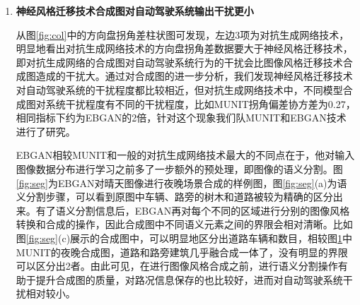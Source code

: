 \begin{enumerate}[itemindent=20pt, listparindent = 0.7cm]
    \begin{figure}[h]
        \centering
        \texttt{[image: gan\_bad]}
        \texttt{[image: models/EBGAN/8]}
        \texttt{[image: models/GAN/1]}
        \caption{MUNIT合成图像样本}
        \label{fig:gan}
    \end{figure}
    
    大部分的对抗生成网络技术中，合成数据的质量主要依赖于系统中的生成器对于原始数据分布的学习能力，以图像数据的生成为例，生成器在学习原图像数据分布时并没有对远图像的语义和风格信息作特殊处理，对图像内容的语义信息也没有类似于语义分割的处理，它是将原图像数据当做一个整体进行数据分布的学习，因此往往会导致最后判别器产生的合成图是对原始图的全盘模拟，特别的当输入数据由风格图和内容图两张图组成时，合成图会展现出两者的综合效果，例如图\ref{fig:gan}展示的,可以发现合成图不仅有白天的道路信息，风格图存在而原图中不存在的建筑、路灯信息却大量地出现在了合成图中。
    
    虽然从合成图与原图相似度上看，对抗生成网络技术的性能不如神经风格迁移技术，但任何事物都有两面性，因为对抗生成网络合成图与原图的差异性是最大的，因此如果想提高自动驾驶系统测试框架中测试用例的覆盖率，即增加路况图像集的多样性，显然使用对抗生成网络相关技术较神经风格迁移技术而言更加合适。

    \item \textbf{神经风格迁移技术合成图对自动驾驶系统输出干扰更小}
    
    从图\ref{fig:col}中的方向盘拐角差柱状图可发现，左边3项为对抗生成网络技术，明显地看出对抗生成网络技术的方向盘拐角差数据要大于神经风格迁移技术，即对抗生成网络的合成图对自动驾驶系统行为的干扰会比图像风格迁移技术合成图造成的干扰大。通过对合成图的进一步分析，我们发现神经风格迁移技术对自动驾驶系统的干扰程度都比较相近，但对抗生成网络技术中，不同模型合成图对系统干扰程度有不同的干扰程度，比如MUNIT拐角偏差协方差为0.27，相同指标下约为EBGAN的2倍，针对这个现象我们队MUNIT和EBGAN技术进行了研究。

    EBGAN相较MUNIT和一般的对抗生成网络技术最大的不同点在于，他对输入图像数据分布进行学习之前多了一步额外的预处理，即图像的语义分割。图\ref{fig:seg}为EBGAN对晴天图像进行夜晚场景合成的样例图，图\ref{fig:seg}(a)为语义分割步骤，可以看到原图中车辆、路旁的树木和道路被较为精确的区分出来。有了语义分割信息后，EBGAN再对每个不同的区域进行分别的图像风格转换和合成的操作，因此合成图中不同语义元素之间的界限会相对清晰。比如图\ref{fig:seg}(c)展示的合成图中，可以明显地区分出道路车辆和数目，相较图\ref{fig:gan}中MUNIT的夜晚合成图，道路和路旁建筑几乎融合成一体了，没有明显的界限可以区分出2者。由此可见，在进行图像风格合成之前，进行语义分割操作有助于提升合成图的质量，对路况信息保存的也比较好，进而对自动驾驶系统干扰相对较小。　


\end{enumerate}
